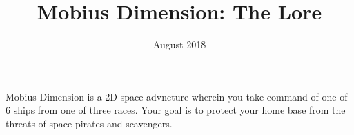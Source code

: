 \documentclass{article}
\title{Mobius Dimension: The Lore}
\author{}
\date{August 2018}
\begin{document}
\maketitle
\newpage


Mobius Dimension is a 2D space advneture wherein you take command of one of 6 ships from one of three races. Your goal is to protect your home base from the threats of space pirates and scavengers.
\end{document}

